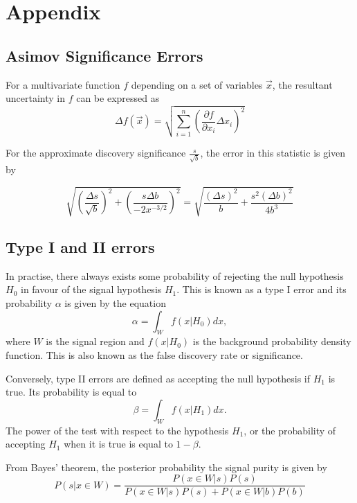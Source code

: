 \section{Appendix}
\subsection{Asimov Significance Errors}
\label{sec:appendix_errors}
For a multivariate function $f$ depending on a set of variables $\overrightarrow{x}$, the resultant uncertainty in $f$ can be expressed as 
\begin{equation}
\Delta f(\overrightarrow{x}) = \sqrt{\sum_{i=1}^{n} 
\left( \frac{\partial f}{\partial x_i}\Delta x_i \right)^2}
\end{equation}

For the approximate discovery significance $\frac{s}{\sqrt{b}}$, the error in this statistic is given by

\begin{equation}
\sqrt{\left( \frac{\Delta s}{\sqrt{b}} \right)^2 + \left( \frac{s\Delta b}{-2x^{-3/2}} \right)^2 } = \sqrt{\frac{(\Delta s)^2}{b} + \frac{s^2 (\Delta b)^2}{4b^{3}}}
\end{equation}

\subsection{Type I and II errors}

In practise, there always exists some probability of rejecting the null hypothesis $H_0$ in favour of the signal hypothesis $H_1$. This is known as a type I error and its probability $\alpha$ is given by the equation
\begin{equation}
\alpha = \int_{W}f(x|H_0)dx,
\end{equation}
where $W$ is the signal region and $f(x|H_0)$ is the background probability density function. This is also known as the false discovery rate or significance.

Conversely, type II errors are defined as accepting the null hypothesis if $H_1$ is true. Its probability is equal to
\begin{equation}
\beta = \int_{W}f(x|H_1)dx.
\end{equation}
The power of the test with respect to the hypothesis $H_1$, or the probability of accepting $H_1$ when it is true is equal to $1-\beta$.

From Bayes' theorem, the posterior probability the signal purity is given by
\begin{equation}
P(s|x\in W) = \frac{P(x\in W|s)P(s)}{P(x\in W|s)P(s) + P(x \in W|b)P(b)}
\end{equation}

